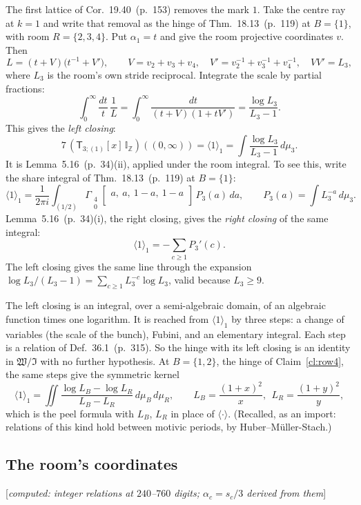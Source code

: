 \documentclass[11pt]{article}
\newcommand{\sT}{\mathsf T}
\newcommand{\Gst}[4]{\Gamma_{\substack{#1\\#2}}\!\begin{bmatrix}#3\\#4\end{bmatrix}}
\newcommand{\IZ}{\mathbb I_{\mathbb Z}}
\newcommand{\Tx}[3]{(\sT_{#1;(1)}[x]\,#2)((#3,\infty))}
\newcommand{\status}[1]{\hfill{\small[\textit{#1}]}}
\newcommand{\hb}[2]{#1~(p.~#2)}   %
\theoremstyle{plain}
\theoremstyle{remark}
\begin{document}
The first lattice of Cor.~\hb{19.40}{153} removes the mark $1$. Take the centre ray at $k=1$ and write that removal as the hinge of Thm.~\hb{18.13}{119} at $B=\{1\}$, with room $R=\{2,3,4\}$. Put $\alpha_1=t$ and give the room projective coordinates $v$. Then
\[
L=(t+V)\big(t^{-1}+V'\big),\qquad V=v_2+v_3+v_4,\quad V'=v_2^{-1}+v_3^{-1}+v_4^{-1},\quad VV'=L_3,
\]
where $L_3$ is the room's own stride reciprocal. Integrate the scale by partial fractions:
\[
\int_0^\infty\frac{dt}{t}\,\frac1L=\int_0^\infty\frac{dt}{(t+V)(1+tV')}=\frac{\log L_3}{L_3-1}.
\]
This gives the \emph{left closing}:
\[
7\,\Tx3{\IZ}0=\langle1\rangle_1=\int\frac{\log L_3}{L_3-1}\,d\mu_3 .
\]
It is Lemma~\hb{5.16}{34}(ii), applied under the room integral. To see this, write the share integral of Thm.~\hb{18.13}{119} at $B=\{1\}$:
\[
\langle1\rangle_1=\frac1{2\pi i}\int_{(1/2)}\Gst40{a,\ a,\ 1-a,\ 1-a}{}\,P_3(a)\,da,\qquad P_3(a)=\int L_3^{-a}\,d\mu_3 .
\]
Lemma~\hb{5.16}{34}(i), the right closing, gives the \emph{right closing} of the same integral:
\[
\langle1\rangle_1=-\sum_{c\ge1}P_3'(c).
\]
The left closing gives the same line through the expansion $\log L_3/(L_3-1)=\sum_{c\ge1}L_3^{-c}\log L_3$, valid because $L_3\ge9$.

The left closing is an integral, over a semi-algebraic domain, of an algebraic function times one logarithm. It is reached from $\langle1\rangle_1$ by three steps: a change of variables (the scale of the bunch), Fubini, and an elementary integral. Each step is a relation of Def.~\hb{36.1}{315}. So the hinge with its left closing is an identity in $\mathfrak W/\mathfrak I$ with no further hypothesis. At $B=\{1,2\}$, the hinge of Claim~\ref{cl:row4}, the same steps give the symmetric kernel
\[
\langle1\rangle_1=\iint\frac{\log L_B-\log L_R}{L_B-L_R}\,d\mu_B\,d\mu_R,\qquad L_B=\frac{(1+x)^2}x,\ \ L_R=\frac{(1+y)^2}y,
\]
which is the peel formula with $L_B$, $L_R$ in place of $\langle\cdot\rangle$. (Recalled, as an import: relations of this kind hold between motivic periods, by Huber--M\"uller-Stach.)

\subsection{The room's coordinates}\status{computed: integer relations at $240$--$760$ digits; $\alpha_c=s_c/3$ derived from them}
\end{document}
